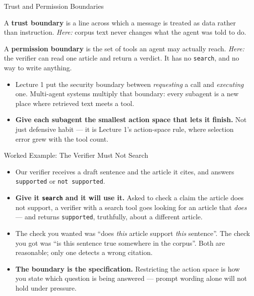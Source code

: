 \begin{frame}{Trust and Permission Boundaries}
\begin{rldefinition}
A \textbf{trust boundary} is a line across which a message is treated as data rather than instruction. \emph{Here:} corpus text never changes what the agent was told to do.

\smallskip
A \textbf{permission boundary} is the set of tools an agent may actually reach. \emph{Here:} the verifier can read one article and return a verdict. It has no \texttt{search}, and no way to write anything.
\end{rldefinition}
\pause
\begin{itemize}
  \item Lecture 1 put the security boundary between \emph{requesting} a call and \emph{executing} one. Multi-agent systems multiply that boundary: every subagent is a new place where retrieved text meets a tool.
  \pause
  \item \textbf{Give each subagent the smallest action space that lets it finish.} Not just defensive habit --- it is Lecture 1's action-space rule, where selection error grew with the tool count.
\end{itemize}
\end{frame}

\begin{frame}{Worked Example: The Verifier Must Not Search}
\begin{itemize}
  \item Our verifier receives a draft sentence and the article it cites, and answers \texttt{supported} or \texttt{not supported}.
  \pause
  \item \textbf{Give it \texttt{search} and it will use it.} Asked to check a claim the article does not support, a verifier with a search tool goes looking for an article that \emph{does} --- and returns \texttt{supported}, truthfully, about a different article.
  \pause
  \item The check you wanted was ``does \emph{this} article support \emph{this} sentence''. The check you got was ``is this sentence true somewhere in the corpus''. Both are reasonable; only one detects a wrong citation.
  \pause
  \item \textbf{The boundary is the specification.} Restricting the action space is how you state which question is being answered --- prompt wording alone will not hold under pressure.
\end{itemize}
\end{frame}

